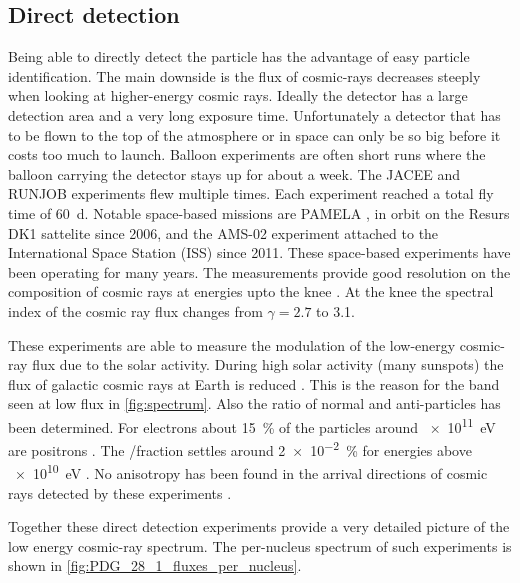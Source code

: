 \subsection{Direct detection}

Being able to directly detect the particle has the advantage of easy particle identification. The main downside is the flux of cosmic-rays decreases steeply when looking at higher-energy cosmic rays. Ideally the detector has a large detection area and a very long exposure time. Unfortunately a detector that has to be flown to the top of the atmosphere or in space can only be so big before it costs too much to launch. Balloon experiments are often short runs where the balloon carrying the detector stays up for about a week. The JACEE \cite{asakimori1998jacee} and RUNJOB \cite{hareyama2011runjob} experiments flew multiple times. Each experiment reached a total fly time of \SI{60}{\day}. Notable space-based missions are PAMELA \cite{adriani2014pamela}, in orbit on the Resurs DK1 sattelite since 2006, and the AMS-02 \cite{casaus2014ams} experiment attached to the International Space Station (ISS) since 2011. These space-based experiments have been operating for many years. The measurements provide good resolution on the composition of cosmic rays at energies upto the knee \cite{amenomori2008knee}. At the knee the spectral index of the cosmic ray flux changes from $\gamma = 2.7$ to 3.1.

These experiments are able to measure the modulation of the low-energy cosmic-ray flux due to the solar activity. During high solar activity (many sunspots) the flux of galactic cosmic rays at Earth is reduced \cite{adriani2013modulation}. This is the reason for the band seen at low flux in \cref{fig:spectrum}. Also the ratio of normal and anti-particles has been determined. For electrons about \SI{15}{\percent} of the particles around \SI{e11}{\eV} are positrons \cite{aguilar2013positrons}. The \APproton/\Pproton fraction settles around \SI{2e-2}{\percent} for energies above \SI{e10}{\eV} \cite{kappl2015antiproton}. No anisotropy has been found in the arrival directions of \APelectron\Pelectron cosmic rays detected by these experiments \cite{panico2015isotropy}.

Together these direct detection experiments provide a very detailed picture of the low energy cosmic-ray spectrum. The per-nucleus spectrum of such experiments is shown in \cref{fig:PDG_28_1_fluxes_per_nucleus}.


